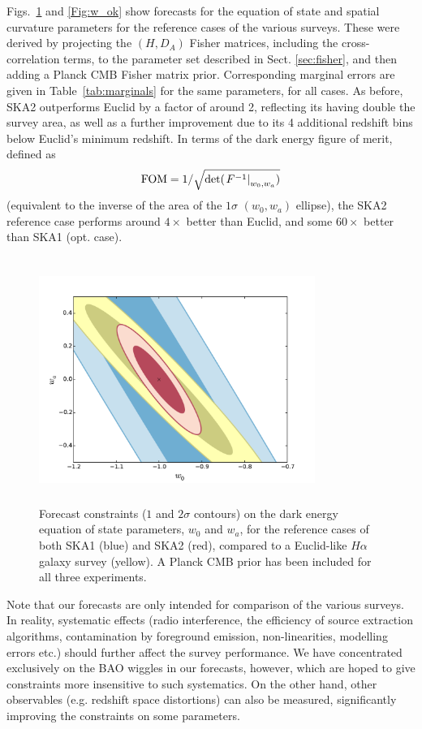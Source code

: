 \documentclass[useAMS,usenatbib]{mn2e}
\newcommand{\corr}{\color{blue}} %
\newcommand{\be}{\begin{equation}}
\newcommand{\ee}{\end{equation}}
\begin{document}
Figs.~\ref{Fig:w_wa} and \ref{Fig:w_ok} show forecasts for the equation of state and spatial curvature parameters for the reference cases of the various surveys. These were derived by projecting the $(H, D_A)$ Fisher matrices, {\corr including the cross-correlation terms}, to the parameter set described in Sect. \ref{sec:fisher}, and then adding a Planck CMB Fisher matrix prior. Corresponding marginal errors are given in Table~\ref{tab:marginals} for the same parameters, for all cases. As before, SKA2 outperforms Euclid by a factor of around 2, reflecting its having double the survey area, as well as a further improvement due to  its 4 additional redshift bins below Euclid's minimum redshift. In terms of the dark energy figure of merit, defined as \citep{BASSETT2011, Coe:2009xf}
\be
{\rm FOM} = 1 / \sqrt{{\rm det}( \left . F^{-1} \right |_{w_0, w_a} )}
\ee
(equivalent to the inverse of the area of the $1\sigma$ $(w_0, w_a)$ ellipse), the SKA2 reference case performs around $4\times$ better than Euclid, and some $60\times$ better than SKA1 (opt. case).

\begin{figure}
\begin{center}
\includegraphics[height=8.0cm,width=9.0cm]{plots/output_ellipse_w0_wa.pdf} 
\caption{Forecast constraints ($1$ and $2\sigma$ contours) on the dark energy equation of state parameters, $w_0$ and $w_a$, for the reference cases of both SKA1 (blue) and SKA2 (red), compared to a Euclid-like $H\alpha$ galaxy survey (yellow). A Planck CMB prior has been included for all three experiments.}
\label{Fig:w_wa}
\end{center}
\end{figure}

Note that our forecasts are only intended for comparison of the various surveys. In reality, systematic effects (radio interference, the efficiency of source extraction algorithms, contamination by foreground emission, non-linearities, modelling errors etc.) should further affect the survey performance. We have concentrated exclusively on the BAO wiggles in our forecasts, however, which are hoped to give constraints more insensitive to such systematics. On the other hand, other observables (e.g. redshift space distortions) can also be measured, significantly improving the constraints on some parameters.
\end{document}
